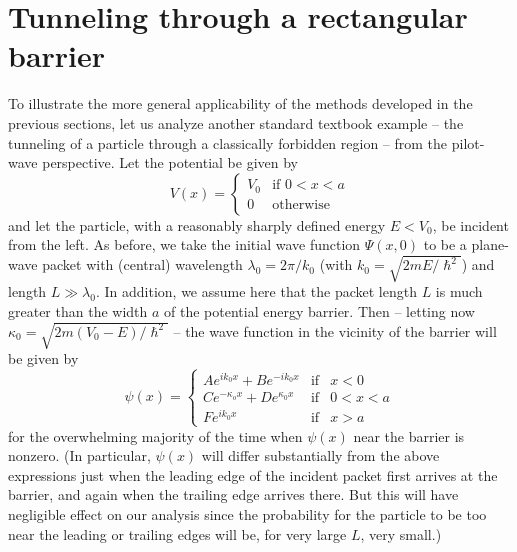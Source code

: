 \documentclass[aps,prc,onecolumn,letterpaper,floatfix,12pt]{revtex4}
\renewcommand{\hbar}{\hslash}
\begin{document}
\section{Tunneling through a rectangular barrier}

To illustrate the more general applicability of the methods developed
in the previous sections, let us analyze another standard textbook
example -- the tunneling of a particle through a classically forbidden
region -- from the pilot-wave perspective.  Let the potential be given
by
\begin{equation}
V(x) = \left\{
\begin{array}{lc}
V_0 & \text{if }  0<x<a \\
0 & \text{otherwise}
\end{array} 
\right.
\end{equation}
and let the particle, with a reasonably sharply defined energy $E <
V_0$, be incident from the left.  As before, we take the initial wave
function $\Psi(x,0)$ to be a plane-wave packet with (central)
wavelength $\lambda_0 = 2 \pi / k_0$ (with $k_0 = \sqrt{2mE/\hbar^2}$)
and length $L \gg \lambda_0$.  In addition, we assume here that the
packet length $L$ is much greater than the width $a$ of the potential
energy barrier.  Then -- letting now $\kappa_0 = \sqrt{2m (V_0 - E) /
  \hbar^2}$ -- the wave function in the vicinity of the barrier
will be given by
\begin{equation}
\psi(x) = \left\{
\begin{array}{lcc}
A e^{ik_0x} + B e^{-i k_0 x} & \text{if} & x < 0 \\ 
C e^{-\kappa_o x} + D e^{\kappa_0 x} & \text{if} & 0 < x < a \\
F e^{i k_0 x} & \text{if} & x > a 
\end{array}
\right.
\end{equation}
for the overwhelming majority of the time when $\psi(x)$ near the
barrier is nonzero.  (In particular, $\psi(x)$ will differ
substantially from the above expressions just when the leading edge of
the incident packet first arrives at the barrier, and again when the
trailing edge arrives there.  But this will have negligible effect on
our analysis since the probability for the particle to be too near the
leading or trailing edges will be, for very large $L$, very small.)  
\end{document}
